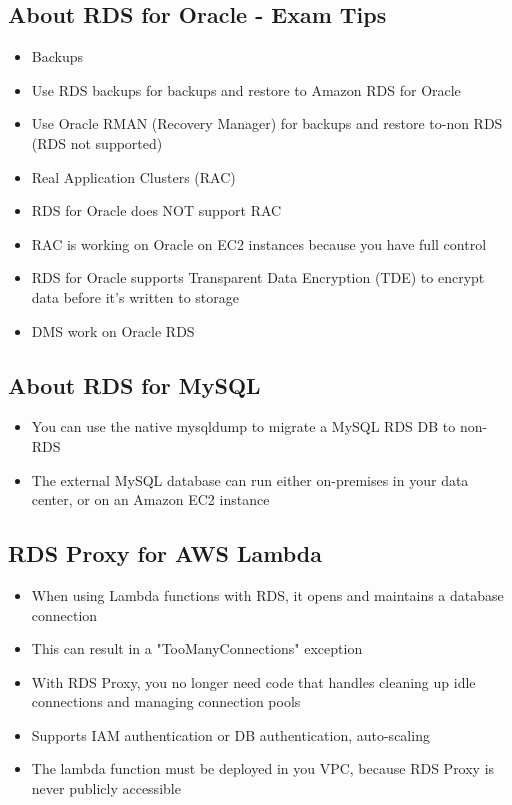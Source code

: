 \subsection{About RDS for Oracle - Exam Tips}
\begin{itemize}
    \item Backups
    \item Use RDS backups for backups and restore to Amazon RDS for Oracle
    \item Use Oracle RMAN (Recovery Manager) for backups and restore to-non RDS (RDS not supported)
    \item Real Application Clusters (RAC)
    \item RDS for Oracle does NOT support RAC
    \item RAC is working on Oracle on EC2 instances because you have full control
    \item RDS for Oracle supports Transparent Data Encryption (TDE) to encrypt data before it's written to storage
    \item DMS work on Oracle RDS
\end{itemize}

\subsection{About RDS for MySQL}
\begin{itemize}
    \item You can use the native mysqldump to migrate a MySQL RDS DB to non-RDS
    \item The external MySQL database can run either on-premises in your data center, or on an Amazon EC2 instance
\end{itemize}

\subsection{RDS Proxy for AWS Lambda}
\begin{itemize}
    \item When using Lambda functions with RDS, it opens and maintains a database connection
    \item This can result in a "TooManyConnections" exception
    \item With RDS Proxy, you no longer need code that handles cleaning up idle connections and managing connection pools
    \item Supports IAM authentication or DB authentication, auto-scaling
    \item The lambda function must be deployed in you VPC, because RDS Proxy is never publicly accessible
\end{itemize}

